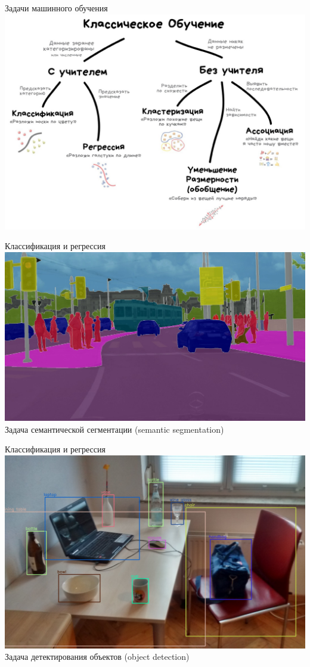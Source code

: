 \documentclass[aspectratio=169, professionalfonts]{beamer}
\begin{document}
\begin{frame}{Задачи машинного обучения}
    \centering
    \includegraphics[width=.67\linewidth]{graphs/fig5.jpg}
\end{frame}

\begin{frame}{Классификация и регрессия}
    \centering
    \includegraphics[width=.78\linewidth]{graphs/fig6.jpg} \\
    Задача семантической сегментации (semantic segmentation)
\end{frame}

\begin{frame}{Классификация и регрессия}
    \centering
    \includegraphics[width=.68\linewidth]{graphs/fig7.jpg} \\
    Задача детектирования объектов (object detection)
\end{frame}
\end{document}
